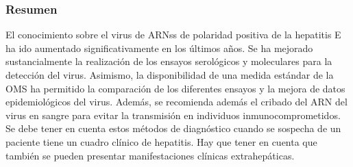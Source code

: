 \documentclass[11 pt]{article}
\begin{document}
\subsubsection{Resumen}
El conocimiento sobre el virus de ARNss de polaridad positiva de la hepatitis E ha ido aumentado significativamente en los últimos años. Se ha mejorado sustancialmente la realización de los ensayos serológicos y moleculares para la detección del virus. Asimismo, la disponibilidad de una medida estándar de la OMS ha permitido la comparación de los diferentes ensayos y la mejora de datos epidemiológicos del virus. Además, se recomienda además el cribado del ARN del virus en sangre para evitar la transmisión en individuos inmunocomprometidos. Se debe tener en cuenta estos métodos de diagnóstico cuando se sospecha de un paciente tiene un cuadro clínico de hepatitis. Hay que tener en cuenta que también se pueden presentar manifestaciones clínicas extrahepáticas. 
\end{document}

